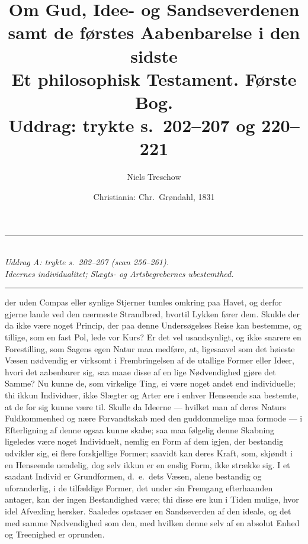 \documentclass[12pt,a4paper]{article}
\title{\textbf{Om Gud, Idee- og Sandseverdenen}\\[4pt]
  \large samt de førstes Aabenbarelse i den sidste\\[6pt]
  \normalsize Et philosophisk Testament. Første Bog.\\[8pt]
  \large Uddrag: trykte s.\ 202--207 og 220--221}
\author{Niels Treschow}
\date{\small Christiania: Chr.\ Grøndahl, 1831}
\newcommand{\spanhead}[1]{%
  \bigskip\begin{center}\rule{0.18\linewidth}{0.4pt}\\[6pt]
  {\small\itshape #1}\\[4pt]\rule{0.18\linewidth}{0.4pt}\end{center}\smallskip}
\newcommand{\opage}[1]{\marginnote{\footnotesize\textit{[#1]}}}
\begin{document}
\maketitle
\thispagestyle{fancy}

\bigskip

\spanhead{Uddrag A: trykte s.\ 202--207 (scan 256--261).\\
  Ideernes individualitet; Slægts- og Artsbegrebernes ubestemthed.}

\opage{202} \noindent
[\dots] der uden Compas eller synlige Stjerner tumles omkring paa Havet, og
derfor gjerne lande ved den nærmeste Strandbred, hvortil Lykken fører dem.
Skulde der da ikke være noget Princip, der paa denne Undersøgelses Reise kan
bestemme, og tillige, som en fast Pol, lede vor Kurs? Er det vel usandsynligt,
og ikke snarere en Forestilling, som Sagens egen Natur maa medføre, at,
ligesaavel som det høieste Væsen nødvendig er virksomt i Frembringelsen af de
utallige Former eller Ideer, hvori det aabenbarer sig, saa maae disse af en lige
Nødvendighed gjøre det Samme? Nu kunne de, som virkelige Ting, ei være noget
andet end individuelle; thi ikkun Individuer, ikke Slægter og Arter ere i enhver
Henseende saa bestemte, at de for sig kunne være til. Skulle da Ideerne ---
hvilket man af deres Naturs Fuldkommenhed og nære Forvandtskab med den
guddommelige maa formode --- i Efterligning af denne ogsaa kunne skabe; saa maa
følgelig denne Skabning ligeledes være noget Individuelt, nemlig en Form af dem
igjen, der bestandig udvikler sig, ei flere forskjellige Former; saavidt kan
deres Kraft, som, skjøndt i en Henseende uendelig, dog selv ikkun er en enslig
Form, ikke strække sig. I et saadant Individ er Grundformen, d.~e.\ dets Væsen,
alene bestandig og uforanderlig, i de tilfældige Former, det under sin Fremgang
efterhaanden antager, kan der ingen Bestandighed være; thi disse ere kun i Tiden
mulige, hvor
\opage{203} idel Afvexling hersker. Saaledes opstaaer en Sandseverden af den ideale, og det
med samme Nødvendighed som den, med hvilken denne selv af en absolut Enhed og
Treenighed er oprunden.
\end{document}
